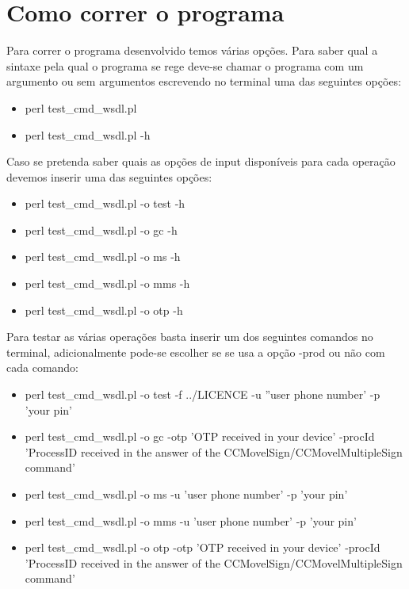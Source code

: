 \section{Como correr o programa}

Para correr o programa desenvolvido temos várias opções. Para saber qual a sintaxe pela qual o programa se rege deve-se chamar o programa com um argumento ou sem argumentos escrevendo no terminal uma das seguintes opções:
\begin{itemize}
	\item perl test\_cmd\_wsdl.pl
	\item perl test\_cmd\_wsdl.pl -h
\end{itemize} 
\hfill\newline
\par Caso se pretenda saber quais as opções de input disponíveis para cada operação devemos inserir uma das seguintes opções:
\begin{itemize}
	\item perl test\_cmd\_wsdl.pl -o test -h
	\item perl test\_cmd\_wsdl.pl -o gc -h
	\item perl test\_cmd\_wsdl.pl -o ms -h
	\item perl test\_cmd\_wsdl.pl -o mms -h
	\item perl test\_cmd\_wsdl.pl -o otp -h
\end{itemize}
\hfill\newline
Para testar as várias operações basta inserir um dos seguintes comandos no terminal, adicionalmente pode-se escolher se se usa a opção -prod ou não com cada comando:
\begin{itemize}
	\item perl test\_cmd\_wsdl.pl -o test -f  ../LICENCE -u ''user phone number' -p 'your pin'
	\hfill\newline
	\item perl test\_cmd\_wsdl.pl -o gc -otp 'OTP received in your device' -procId 'ProcessID received in the answer of the   CCMovelSign/CCMovelMultipleSign command'
	\hfill\newline
	\item perl test\_cmd\_wsdl.pl -o ms -u 'user phone number' -p 'your pin'
	\hfill\newline
	\item perl test\_cmd\_wsdl.pl -o mms -u 'user phone number' -p 'your pin'
	\hfill\newline
	\item perl test\_cmd\_wsdl.pl -o otp -otp 'OTP received in your device' -procId 'ProcessID received in the answer of the   CCMovelSign/CCMovelMultipleSign command'
\end{itemize}
